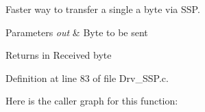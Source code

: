 Faster way to transfer a single a byte via S\+SP. 


\begin{DoxyParams}{Parameters}
{\em out} & Byte to be sent \\
\hline
\end{DoxyParams}
\begin{DoxyReturn}{Returns}
in Received byte 
\end{DoxyReturn}


Definition at line 83 of file Drv\+\_\+\+S\+S\+P.\+c.



Here is the caller graph for this function\+:


